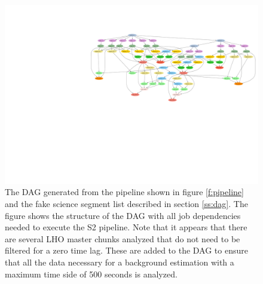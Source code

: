 \begin{figure}
\begin{center}
\hspace*{-0.2in}\includegraphics[width=\linewidth]{figures/pipeline/fake_segs_dag}
\end{center}
\caption{
\label{f:fake_segs_dag}
The DAG generated from the pipeline shown in figure \ref{f:pipeline} and the
fake science segment list described in section \ref{ss:dag}. The figure shows
the structure of the DAG with all job dependencies needed to execute the S2
pipeline. Note that it appears that there are several LHO master chunks
analyzed that do not need to be filtered for a zero time lag.  These are added
to the DAG to ensure that all the data necessary for a background estimation
with a maximum time side of 500 seconds is analyzed.
}
\end{figure}

